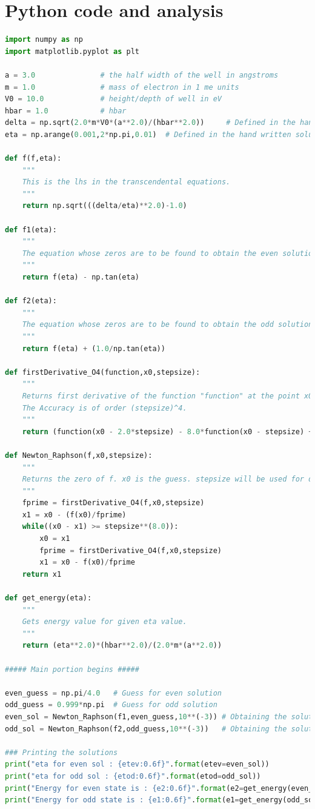 \documentclass[a4paper,10pt]{article}
\title{}
\author{}
\date{}
\begin{document}
\section*{Python code and analysis}
\begin{lstlisting}[language=python]
import numpy as np
import matplotlib.pyplot as plt

a = 3.0               # the half width of the well in angstroms 
m = 1.0               # mass of electron in 1 me units
V0 = 10.0             # height/depth of well in eV
hbar = 1.0            # hbar
delta = np.sqrt(2.0*m*V0*(a**2.0)/(hbar**2.0))     # Defined in the hand written solution
eta = np.arange(0.001,2*np.pi,0.01)  # Defined in the hand written solutiom

def f(f,eta):
    """
    This is the lhs in the transcendental equations.
    """
    return np.sqrt(((delta/eta)**2.0)-1.0)

def f1(eta):
    """
    The equation whose zeros are to be found to obtain the even solution.
    """
    return f(eta) - np.tan(eta)

def f2(eta):
    """
    The equation whose zeros are to be found to obtain the odd solution.
    """
    return f(eta) + (1.0/np.tan(eta))

def firstDerivative_O4(function,x0,stepsize):
    """
    Returns first derivative of the function "function" at the point x0 by considering points, one and two steps on either side of x0.
    The Accuracy is of order (stepsize)^4.
    """
    return (function(x0 - 2.0*stepsize) - 8.0*function(x0 - stepsize) + 8.0*function(x0 + stepsize) - function(x0 + 2.0*stepsize))/(12.0*stepsize)

def Newton_Raphson(f,x0,stepsize):
    """
    Returns the zero of f. x0 is the guess. stepsize will be used for determining the first derivative of f.
    """
    fprime = firstDerivative_O4(f,x0,stepsize)
    x1 = x0 - (f(x0)/fprime)
    while((x0 - x1) >= stepsize**(8.0)):
        x0 = x1
        fprime = firstDerivative_O4(f,x0,stepsize)
        x1 = x0 - f(x0)/fprime
    return x1

def get_energy(eta):
    """
    Gets energy value for given eta value.
    """
    return (eta**2.0)*(hbar**2.0)/(2.0*m*(a**2.0))

##### Main portion begins #####

even_guess = np.pi/4.0   # Guess for even solution
odd_guess = 0.999*np.pi  # Guess for odd solution
even_sol = Newton_Raphson(f1,even_guess,10**(-3)) # Obtaining the solution using the Newton Raphson method
odd_sol = Newton_Raphson(f2,odd_guess,10**(-3))   # Obtaining the solution using the Newton Raphson method

### Printing the solutions
print("eta for even sol : {etev:0.6f}".format(etev=even_sol))
print("eta for odd sol : {etod:0.6f}".format(etod=odd_sol))
print("Energy for even state is : {e2:0.6f}".format(e2=get_energy(even_sol)))
print("Energy for odd state is : {e1:0.6f}".format(e1=get_energy(odd_sol)))

\end{lstlisting}
\end{document}

